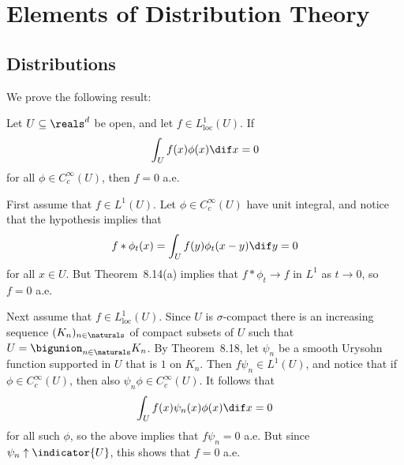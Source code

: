 \documentclass[article, a4paper, 11pt, oneside]{memoir}
\numberwithin{equation}{chapter}
\newenvironment{displaytheorem}{%
	\begin{displayquote}\itshape%
}{%
	\end{displayquote}%
}
\theoremstyle{nonumberplain}
\begin{document}
\chapter{Elements of Distribution Theory}

\section{Distributions}

\newcommand{\loc}{\mathrm{loc}}

\begin{remarkbreak}
	We prove the following result:
	\begin{displaytheorem}
		Let $U \subseteq \reals^d$ be open, and let $f \in L^1_{\loc}(U)$. If
		\begin{equation*}
			\int_U f(x) \phi(x) \dif x
				= 0
		\end{equation*}
		for all $\phi \in C_c^\infty(U)$, then $f = 0$ a.e.
	\end{displaytheorem}
	First assume that $f \in L^1(U)$. Let $\phi \in C_c^\infty(U)$ have unit integral, and notice that the hypothesis implies that
	\begin{equation*}
		f * \phi_t(x)
			= \int_U f(y) \phi_t(x - y) \dif y
			= 0
	\end{equation*}
	for all $x \in U$. But Theorem~8.14(a) implies that $f * \phi_t \to f$ in $L^1$ as $t \to 0$, so $f = 0$ a.e.

	Next assume that $f \in L^1_{\loc}(U)$. Since $U$ is $\sigma$-compact there is an increasing sequence $(K_n)_{n \in \naturals}$ of compact subsets of $U$ such that $U = \bigunion_{n \in \naturals} K_n$. By Theorem~8.18, let $\psi_n$ be a smooth Urysohn function supported in $U$ that is $1$ on $K_n$. Then $f \psi_n \in L^1(U)$, and notice that if $\phi \in C_c^\infty(U)$, then also $\psi_n \phi \in C_c^\infty(U)$. It follows that
	\begin{equation*}
		\int_U f(x) \psi_n(x) \phi(x) \dif x
			= 0
	\end{equation*}
	for all such $\phi$, so the above implies that $f \psi_n = 0$ a.e. But since $\psi_n \uparrow \indicator{U}$, this shows that $f = 0$ a.e.
\end{remarkbreak}
\end{document}
